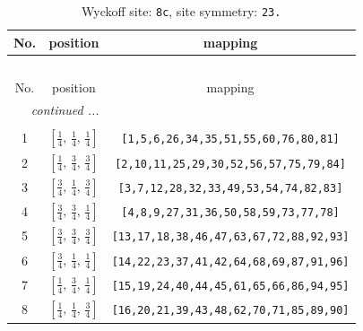 \documentclass[fleqn,8pt]{jsarticle}
\begin{document}
\begin{longtable}{ccc}
\caption{Wyckoff site: {\tt 8c}, site symmetry: {\tt 23.}}
 \\
 \hline \hline
No. & position & mapping \\ \hline \endfirsthead

\multicolumn{2}{l}{\tablename\ \thetable{}} \\
 \hline \hline
No. & position & mapping \\ \hline \endhead

 \hline \hline
\multicolumn{2}{r}{\footnotesize\it continued ...} \\ \endfoot

 \hline \hline
\multicolumn{2}{r}{} \\ \endlastfoot

1 & $\left[ \frac{1}{4},\, \frac{1}{4},\, \frac{1}{4} \right]$ & {\tt [1,5,6,26,34,35,51,55,60,76,80,81]} \\ \hline
2 & $\left[ \frac{1}{4},\, \frac{3}{4},\, \frac{3}{4} \right]$ & {\tt [2,10,11,25,29,30,52,56,57,75,79,84]} \\ \hline
3 & $\left[ \frac{3}{4},\, \frac{1}{4},\, \frac{3}{4} \right]$ & {\tt [3,7,12,28,32,33,49,53,54,74,82,83]} \\ \hline
4 & $\left[ \frac{3}{4},\, \frac{3}{4},\, \frac{1}{4} \right]$ & {\tt [4,8,9,27,31,36,50,58,59,73,77,78]} \\ \hline
5 & $\left[ \frac{3}{4},\, \frac{3}{4},\, \frac{3}{4} \right]$ & {\tt [13,17,18,38,46,47,63,67,72,88,92,93]} \\ \hline
6 & $\left[ \frac{3}{4},\, \frac{1}{4},\, \frac{1}{4} \right]$ & {\tt [14,22,23,37,41,42,64,68,69,87,91,96]} \\ \hline
7 & $\left[ \frac{1}{4},\, \frac{3}{4},\, \frac{1}{4} \right]$ & {\tt [15,19,24,40,44,45,61,65,66,86,94,95]} \\ \hline
8 & $\left[ \frac{1}{4},\, \frac{1}{4},\, \frac{3}{4} \right]$ & {\tt [16,20,21,39,43,48,62,70,71,85,89,90]} \\
\end{longtable}
\renewcommand{\arraystretch}{1.2}
\end{document}
